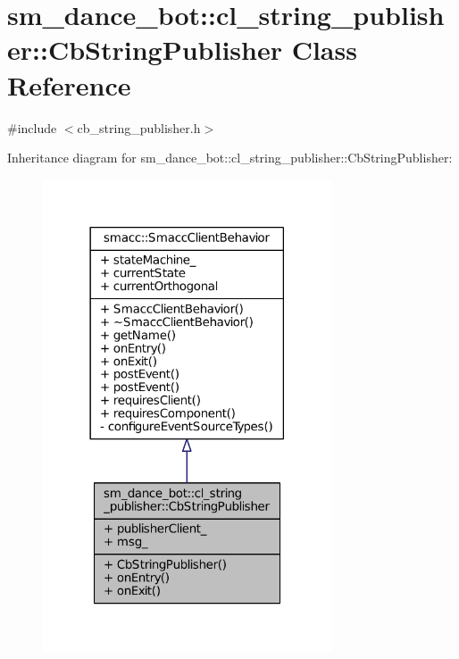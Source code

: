 \hypertarget{classsm__dance__bot_1_1cl__string__publisher_1_1CbStringPublisher}{}\section{sm\+\_\+dance\+\_\+bot\+:\+:cl\+\_\+string\+\_\+publisher\+:\+:Cb\+String\+Publisher Class Reference}
\label{classsm__dance__bot_1_1cl__string__publisher_1_1CbStringPublisher}


{\ttfamily \#include $<$cb\+\_\+string\+\_\+publisher.\+h$>$}



Inheritance diagram for sm\+\_\+dance\+\_\+bot\+:\+:cl\+\_\+string\+\_\+publisher\+:\+:Cb\+String\+Publisher\+:
\nopagebreak
\begin{figure}[H]
\begin{center}
\leavevmode
\includegraphics[width=242pt]{classsm__dance__bot_1_1cl__string__publisher_1_1CbStringPublisher__inherit__graph}
\end{center}
\end{figure}


